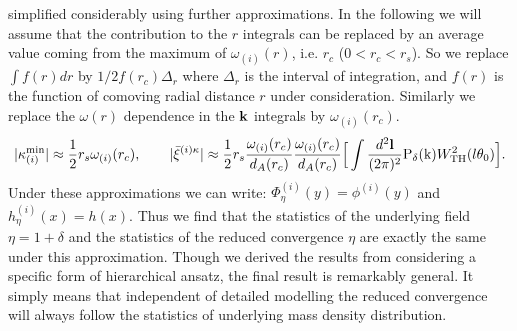 \documentclass[usenatbib]{mn2e}
\def\bl{{\bf l}}
\def\bl{{\bf l}}
\begin{document}
simplified considerably using further approximations. In the following we will
assume that the contribution to the $r$ integrals can be
replaced by an average value coming from the maximum of $\omega_{(i)}(r)$,
i.e. $r_c$ ($0<r_c<r_s$). So we replace $\int f(r) dr$
by $1/2 f(r_c)\Delta_{r}$ where $\Delta_{r}$ is the
interval of integration, and $f(r)$ is the function of comoving radial distance $r$ under
consideration.  Similarly we replace the $\omega(r)$ dependence in 
the ${\bf k}$ integrals by $\omega_{(i)}(r_c)$. 
\begin{equation}
|\kappa_{(i)}^{\rm min}| \approx {1\over 2} r_s \omega_{(i)}(r_c), 
\quad\quad |\bar\xi^{(i)\kappa}|  \approx {1\over 2} r_s  {\omega_{(i)}(r_c)\over d_A(r_c)}{\omega_{(i)}(r_c)\over d_A(r_c)} \Big [ \int {d^2 \bl \over
(2\pi)^2} {\rm P_{\delta}(k)} W_{\rm TH}^2(l\theta_0) \Big ].
\label{eq:approx}
\end{equation}
Under these approximations we can write: $\Phi^{(i)}_{\eta}(y) = \phi^{(i)}(y)$  and  $h^{(i)}_{\eta}(x) = h(x)$.
Thus we find that the statistics of the underlying field $\eta=1+\delta$ and the 
statistics of 
the reduced convergence $\eta$ are exactly the same under this
approximation. Though we derived the results from considering a 
specific form of hierarchical ansatz, the final result is remarkably
general. It simply means that independent of detailed modelling
the reduced convergence will always follow the statistics of underlying
mass density distribution.
\end{document}
